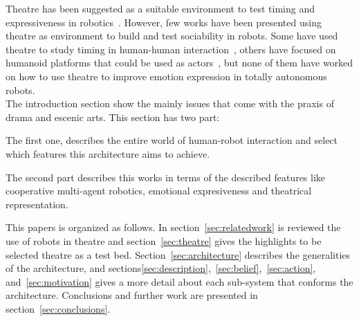 Theatre has been suggested as a suitable environment to test timing and expressiveness in robotics~\cite{Breazeal2003,Fan2013,Hoffman2009,lu2011position,Pinhanez97}. However, few works have been presented using theatre as environment to build and test sociability in robots. Some have used theatre to study timing in human-human interaction~\cite{Knight2011,Knight2011b}, others have focused on humanoid platforms that could be used as actors~\cite{Fan2009,Fan2013}, but none of them have worked on how to use theatre to improve emotion expression in totally autonomous robots.\\ 

The introduction section show the mainly issues that come with the praxis of drama and escenic arts. This section has two part:

The first one, describes the entire world of human-robot interaction and select which features this architecture aims to achieve.

The second part describes this works in terms of the described features like cooperative multi-agent robotics, emotional expresiveness and theatrical representation.

This papers is organized as follows. In section~\ref{sec:relatedwork} is reviewed the use of robots in theatre and section~\ref{sec:theatre} gives the highlights to be selected theatre as a test bed. Section~\ref{sec:architecture} describes the generalities of the architecture, and sections\ref{sec:description},~\ref{sec:belief},~\ref{sec:action}, and~\ref{sec:motivation} gives a more detail about each sub-system that conforms the architecture. Conclusions and further work are presented in section~\ref{sec:conclusions}. 

